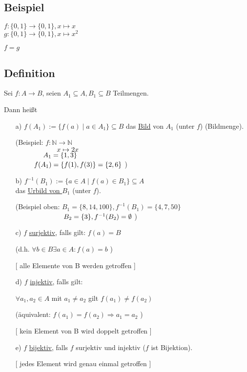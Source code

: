 \documentclass[a4paper, 12pt, twoside] {article}
\begin{document}
\subsection{Beispiel} %

$f \colon \{0,1\} \rightarrow \{0,1\}, x \mapsto x$ \\
$g \colon \{0,1\} \rightarrow \{0,1\}, x \mapsto x^2$

$f=g$

\subsection[Definition (Bild, Urbild, Injektivität, Surjektivität, Bijektivität)]{Definition} %

Sei $f \colon A \rightarrow B$, seien $A_1 \subseteq A, B_1 \subseteq B$ Teilmengen.

Dann heißt

\begin{itemize}
\item[a)] $f(A_1) := \{f(a) \mid a \in A_1\} \subseteq B$ das \underline{Bild} von $A_1$ (unter $f$) (Bildmenge).

(Beispiel: $f \colon \mathbb{N} \rightarrow \mathbb{N}$ \\
$\text{\qquad\qquad\qquad} x \mapsto 2x$ \\
$\text{\qquad\qquad} A_1 = \{1,3\}$ \\
$\text{\space\qquad\space} f(A_1) = \{f(1), f(3)\} = \{2,6\}$ )

\item[b)] $f^{-1}(B_1) := \{a \in A \mid f(a) \in B_1\} \subseteq A$ \\
das \underline{Urbild von $B_1$} (unter $f$).

(Beispiel oben: $B_1 = \{8,14,100\}, f^{-1}(B_1) = \{4,7,50\}$ \\
$\text{\qquad\qquad\qquad\quad} B_2 = \{3\}, f^{-1}(B_2) = \emptyset$ )

\item[c)] $f$ \underline{surjektiv}, falls gilt: $f(a) = B$

(d.h. $\forall b \in B \exists a \in A : f(a) = b$ )

{\color{orange} [ alle Elemente von B werden getroffen ] }

\item[d)] $f$ \underline{injektiv}, falls gilt:

$\forall a_1, a_2 \in A$ mit $a_1 \neq a_2$ gilt $f(a_1) \neq f(a_2)$

(äquivalent: $f(a_1) = f(a_2) \Rightarrow a_1 = a_2$ )

{\color{orange} [ kein Element von B wird doppelt getroffen ] }

\item[e)] $f$ \underline{bijektiv}, falls $f$ surjektiv und injektiv ($f$ ist Bijektion).

{\color{orange} [ jedes Element wird genau einmal getroffen ] }

\end{itemize}
\end{document}
